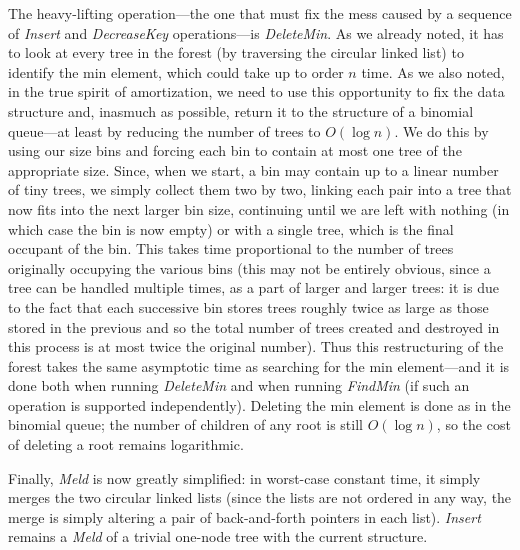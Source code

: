 \documentclass[11pt]{article}
\begin{document}
The heavy-lifting operation---the one that must fix the mess caused by
a sequence of \emph{Insert} and \emph{DecreaseKey} operations---is
\emph{DeleteMin}.  As we already noted, it has to look at every tree in the forest (by traversing the circular linked list) to identify the min element, which
could take up to order $n$ time.  As we also noted, in the true spirit of
amortization, we need to use this opportunity to fix the data structure and,
inasmuch as possible, return it to the structure of a binomial queue---at
least by reducing the number of trees to $O(\log n)$.
We do this by using our size bins and forcing each bin to contain at most
one tree of the appropriate size.  Since, when we start, a bin may contain
up to a linear number of tiny trees, we simply collect them two by two,
linking each pair into a tree that now fits into the next larger bin size,
continuing until we are left with nothing (in which case the bin is now empty)
or with a single tree, which is the final occupant of the bin.  This takes
time proportional to the number of trees originally occupying the various bins
(this may not be entirely obvious, since a tree can be handled multiple
times, as a part of larger and larger trees: it is due to the fact that
each successive bin stores trees roughly twice as large as those stored
in the previous and so the total number of trees created and destroyed
in this process is at most twice the original number).
Thus this restructuring of the forest takes the same asymptotic time as
searching for the min element---and it is done both when running
\emph{DeleteMin} and when running \emph{FindMin} (if such an operation
is supported independently).
Deleting the min element is done as in the binomial queue; the number of
children of any root is still $O(\log n)$, so the cost of deleting a root
remains logarithmic.

Finally, \emph{Meld} is now greatly simplified: in worst-case constant time, it
simply merges the two circular linked lists (since the
lists are not ordered in any way, the merge is simply altering a pair
of back-and-forth pointers in each list).  \emph{Insert}
remains a \emph{Meld} of a trivial one-node tree with the current
structure.
\end{document}
